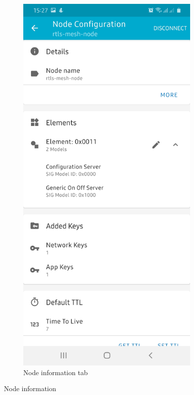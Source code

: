 \documentclass[\main/main.tex]{subfiles}
\begin{document}
\begin{figure}[H]
    \begin{subfigure}[b]{0.4\linewidth}
        \centering
        \includegraphics[width=0.9\linewidth]{nRF_Mesh_05.jpg}
        \caption{Node information tab}
    \end{subfigure}
    \caption{Node information}
    \label{fig:node_information}
\end{figure}
\end{document}

